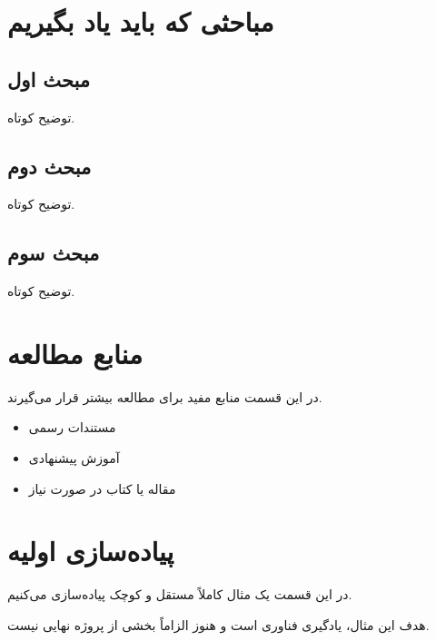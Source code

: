 
\section{مباحثی که باید یاد بگیریم}

\subsection{مبحث اول}

توضیح کوتاه.

\subsection{مبحث دوم}

توضیح کوتاه.

\subsection{مبحث سوم}

توضیح کوتاه.



\section{منابع مطالعه}

در این قسمت منابع مفید برای مطالعه بیشتر قرار می‌گیرند.

\begin{itemize}

    \item مستندات رسمی
    \item آموزش پیشنهادی
    \item مقاله یا کتاب در صورت نیاز

\end{itemize}



\section{پیاده‌سازی اولیه}

در این قسمت یک مثال کاملاً مستقل و کوچک پیاده‌سازی می‌کنیم.

هدف این مثال، یادگیری فناوری است و هنوز الزاماً
بخشی از پروژه نهایی نیست.



